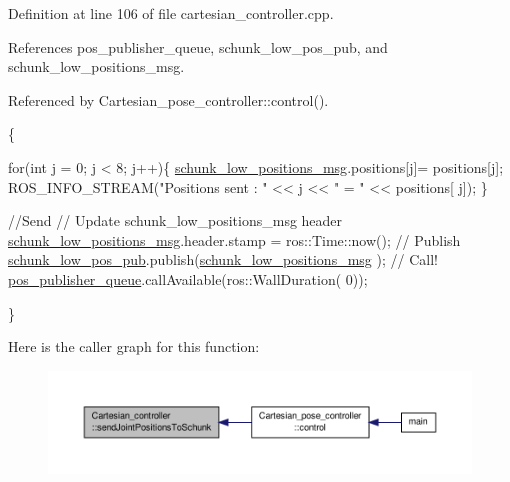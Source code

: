 Definition at line 106 of file cartesian\-\_\-controller.\-cpp.



References pos\-\_\-publisher\-\_\-queue, schunk\-\_\-low\-\_\-pos\-\_\-pub, and schunk\-\_\-low\-\_\-positions\-\_\-msg.



Referenced by Cartesian\-\_\-pose\-\_\-controller\-::control().


\begin{DoxyCode}
                                                                               
       \{

        \textcolor{keywordflow}{for}(\textcolor{keywordtype}{int} j = 0; j < 8; j++)\{
                \hyperlink{classCartesian__controller_a2dd700542bd6243eef10d34811055584}{schunk\_low\_positions\_msg}.positions[j]=
      positions[j];
                ROS\_INFO\_STREAM(\textcolor{stringliteral}{"Positions sent : "} << j << \textcolor{stringliteral}{" = "} << positions[
      j]);
        \}

        \textcolor{comment}{//Send}
        \textcolor{comment}{// Update schunk\_low\_positions\_msg header}
        \hyperlink{classCartesian__controller_a2dd700542bd6243eef10d34811055584}{schunk\_low\_positions\_msg}.header.stamp = 
      ros::Time::now();
        \textcolor{comment}{// Publish}
        \hyperlink{classCartesian__controller_af06313084ef058d1f979fddeb33d5100}{schunk\_low\_pos\_pub}.publish(\hyperlink{classCartesian__controller_a2dd700542bd6243eef10d34811055584}{schunk\_low\_positions\_msg}
      );
        \textcolor{comment}{// Call!}
        \hyperlink{classCartesian__controller_adbb9cddf4092cba9042294740c5371eb}{pos\_publisher\_queue}.callAvailable(ros::WallDuration(
      0));

\}
\end{DoxyCode}


Here is the caller graph for this function\-:\nopagebreak
\begin{figure}[H]
\begin{center}
\leavevmode
\includegraphics[width=350pt]{classCartesian__controller_ae845f67c81c2649bfbaccf95230f2599_icgraph}
\end{center}
\end{figure}


